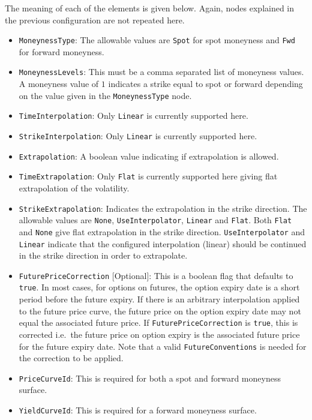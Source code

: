 The meaning of each of the elements is given below. Again, nodes explained in the previous configuration are not repeated here.
\begin{itemize}
\item \lstinline!MoneynessType!:
The allowable values are \lstinline!Spot! for spot moneyness and \lstinline!Fwd! for forward moneyness.

\item \lstinline!MoneynessLevels!:
This must be a comma separated list of moneyness values. A moneyness value of $1$ indicates a strike equal to spot or forward depending on the value given in the \lstinline!MoneynessType! node.

\item \lstinline!TimeInterpolation!:
Only \lstinline!Linear! is currently supported here.

\item \lstinline!StrikeInterpolation!:
Only \lstinline!Linear! is currently supported here.

\item \lstinline!Extrapolation!:
A boolean value indicating if extrapolation is allowed.

\item \lstinline!TimeExtrapolation!:
Only \lstinline!Flat! is currently supported here giving flat extrapolation of the volatility.

\item \lstinline!StrikeExtrapolation!:
Indicates the extrapolation in the strike direction. The allowable values are \lstinline!None!, \lstinline!UseInterpolator!, \lstinline!Linear! and \lstinline!Flat!. Both \lstinline!Flat! and \lstinline!None! give flat extrapolation in the strike direction. \lstinline!UseInterpolator! and \lstinline!Linear! indicate that the configured interpolation (linear) should be continued in the strike direction in order to extrapolate.

\item \lstinline!FuturePriceCorrection! [Optional]:
This is a boolean flag that defaults to \lstinline!true!. In most cases, for options on futures, the option expiry date is a short period before the future expiry. If there is an arbitrary interpolation applied to the future price curve, the future price on the option expiry date may not equal the associated future price. If \lstinline!FuturePriceCorrection! is \lstinline!true!, this is corrected i.e.\ the future price on option expiry is the associated future price for the future expiry date. Note that a valid \lstinline!FutureConventions! is needed for the correction to be applied.

\item \lstinline!PriceCurveId!:
This is required for both a spot and forward moneyness surface.

\item \lstinline!YieldCurveId!:
This is required for a forward moneyness surface.

\end{itemize}


